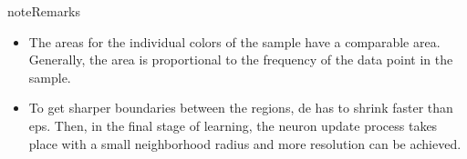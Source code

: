 \documentclass[letterpaper,10pt,english]{jupyterBook}
\begin{document}
\begin{sphinxVerbatim}[commandchars=\\\{\}]

   
       
        \PYG{p}{[}\PYG{p}{]}\PYG{p}{[}\PYG{p}{]} 

\end{sphinxVerbatim}

\noindent{}

\begin{sphinxadmonition}{note}{Remarks}
\begin{itemize}
\item {} 
\sphinxAtStartPar
The areas for the individual colors of the sample have a comparable area. Generally, the area is proportional to the frequency of the data point in the sample.

\item {} 
\sphinxAtStartPar
To get sharper boundaries between the regions, de has to shrink faster than eps. Then, in the final stage of learning, the neuron update process takes place with a small neighborhood radius and more resolution can be achieved.

\end{itemize}
\end{sphinxadmonition}
\end{document}
